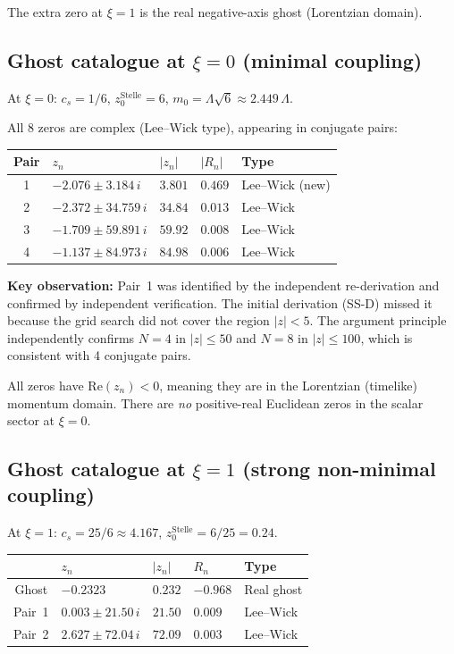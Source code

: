 \documentclass[11pt,a4paper]{article}
\newcommand{\Real}{\mathrm{Re}}
\begin{document}
The extra zero at $\xi = 1$ is the real negative-axis ghost (Lorentzian domain).

\subsection{Ghost catalogue at $\xi = 0$ (minimal coupling)}

At $\xi = 0$: $c_s = 1/6$, $z_0^{\mathrm{Stelle}} = 6$,
$m_0 = \Lambda\sqrt{6} \approx 2.449\,\Lambda$.

All 8 zeros are complex (Lee--Wick type), appearing in conjugate pairs:

\begin{center}
\begin{tabular}{c l l l l}
\toprule
Pair & $z_n$ & $|z_n|$ & $|R_n|$ & Type \\
\midrule
1 & $-2.076 \pm 3.184\,i$ & $3.801$ & $0.469$ & Lee--Wick (new) \\
2 & $-2.372 \pm 34.759\,i$ & $34.84$ & $0.013$ & Lee--Wick \\
3 & $-1.709 \pm 59.891\,i$ & $59.92$ & $0.008$ & Lee--Wick \\
4 & $-1.137 \pm 84.973\,i$ & $84.98$ & $0.006$ & Lee--Wick \\
\bottomrule
\end{tabular}
\end{center}

\textbf{Key observation:} Pair~1 was identified by the independent
re-derivation and confirmed by independent verification.
The initial derivation (SS-D) missed it because the grid search did not
cover the region $|z| < 5$.  The argument principle independently confirms
$N = 4$ in $|z| \leq 50$ and $N = 8$ in $|z| \leq 100$, which is consistent
with 4 conjugate pairs.

All zeros have $\Real(z_n) < 0$, meaning they are in the Lorentzian
(timelike) momentum domain.  There are \emph{no} positive-real Euclidean
zeros in the scalar sector at $\xi = 0$.

\subsection{Ghost catalogue at $\xi = 1$ (strong non-minimal coupling)}

At $\xi = 1$: $c_s = 25/6 \approx 4.167$, $z_0^{\mathrm{Stelle}} = 6/25 = 0.24$.

\begin{center}
\begin{tabular}{c l l l l}
\toprule
& $z_n$ & $|z_n|$ & $R_n$ & Type \\
\midrule
Ghost & $-0.2323$ & $0.232$ & $-0.968$ & Real ghost \\
Pair~1 & $0.003 \pm 21.50\,i$ & $21.50$ & $0.009$ & Lee--Wick \\
Pair~2 & $2.627 \pm 72.04\,i$ & $72.09$ & $0.003$ & Lee--Wick \\
\bottomrule
\end{tabular}
\end{center}
\end{document}
